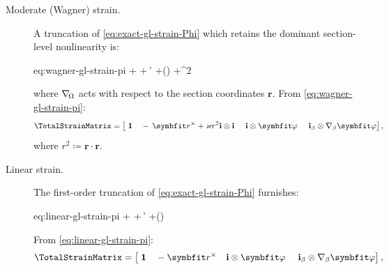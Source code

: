 \begin{description}
\item[Moderate (Wagner) strain.]
A truncation of \eqref{eq:exact-gl-strain-Phi} which retains the dominant section-level nonlinearity is:
\begin{SaveEquation}{eq:wagner-gl-strain-pi}
%
\hat{\StrainVector}\coloneq
\bm{\gamma}
+\bm{\kappa}\times{}
+\FrameBasis\otimes\WarpAxialShapes\,\bm{\alpha}'
+\gradS (\WarpAxialShapes\cdot\bm{\alpha})
+\Twist^2\,
\cdot{}\,\FrameBasis
\end{SaveEquation}
where \(\nabla_{\!\Omega}\) acts with respect to the section coordinates \(\bm{r}\). 
From \eqref{eq:wagner-gl-strain-pi}:
\begin{equation}
\TotalStrainMatrix
=\left[
\;\mathbf{1}
~~~-\,\bm{r}^{\times}+\Twist r^2 \FrameBasis\otimes\FrameBasis
~~~~\FrameBasis\otimes\WarpAxialShapes
~~~~\FrameBasis_{\beta}\otimes\nabla_{\beta}\WarpAxialShapes
\right],
\label{eq:def-section-kinematic-matrix-wagner}
\end{equation}
where \(r^2 \coloneq \bm{r}\cdot\bm{r}\).

\item[Linear strain.]
The first-order truncation of \eqref{eq:exact-gl-strain-Phi} furnishes:
\begin{SaveEquation}{eq:linear-gl-strain-pi}
\hat{\StrainVector}\coloneq
\bm{\gamma}
+\bm{\kappa}\times{}
+\FrameBasis\otimes\WarpAxialShapes\,\bm{\alpha}'
+\gradS (\WarpAxialShapes\cdot\bm{\alpha})
\end{SaveEquation}

From \eqref{eq:linear-gl-strain-pi}:
\begin{equation}
\TotalStrainMatrix
=\left[
\;\mathbf{1}
~~~-\bm{r}^{\times}
~~~\FrameBasis\otimes\WarpAxialShapes
~~~~\FrameBasis_{\beta}\otimes\nabla_{\beta}\WarpAxialShapes
\right],
\label{eq:def-section-kinematic-matrix-Phi}
\end{equation}
\end{description}

